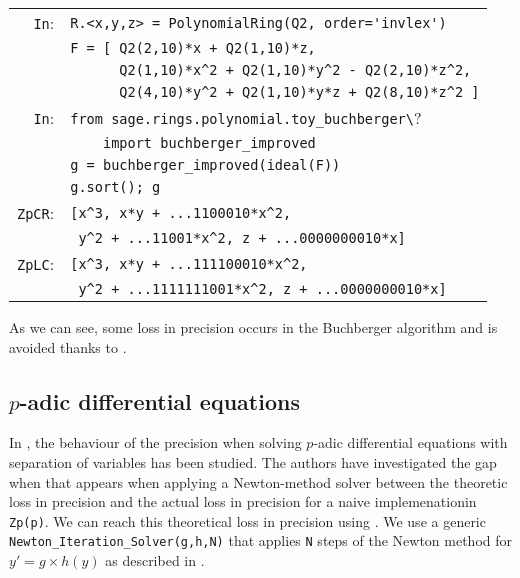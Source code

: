 \documentclass[sigconf]{acmart}
\newcommand{\ZpFP}{\text{\color{output} \rm \tt ZpFP}\xspace}
\newcommand{\ZpL}{\text{\color{output} \rm \tt ZpL}\xspace}
\newcommand{\cIn}{{\color{input} \tt \phantom{Zp}In}:}
\newcommand{\cZpCR}{{\color{output} \tt ZpCR}:}
\newcommand{\cZpLC}{{\color{output} \tt ZpLC}:}
\theoremstyle{definition}
\begin{document}
{\noindent \small
\begin{tabular}{@{}rl}
\cIn
 & \verb?R.<x,y,z> = ?{\color{constructor}\verb?PolynomialRing?}\verb?(?{\color{ring}\verb?Q2?}\verb?, order=?{\color{string}\verb?'invlex'?}\verb?)? \\
 & \verb?F = [ ?{\color{ring}\verb?Q2?}\verb?(2,10)*x + ?{\color{ring}\verb?Q2?}\verb?(1,10)*z, ? \\
 & \verb?      ?{\color{ring}\verb?Q2?}\verb?(1,10)*x^2 + ?{\color{ring}\verb?Q2?}\verb?(1,10)*y^2 - ?{\color{ring}\verb?Q2?}\verb?(2,10)*z^2,? \\
 & \verb?      ?{\color{ring}\verb?Q2?}\verb?(4,10)*y^2 + ?{\color{ring}\verb?Q2?}\verb?(1,10)*y*z + ?{\color{ring}\verb?Q2?}\verb?(8,10)*z^2 ]? \\
\cIn
 & {\color{keyword}\verb?from?}\verb? sage.rings.polynomial.toy_buchberger\?\\
 & \verb?    ?{\color{keyword}\verb?import?}\verb? ?{\color{function}\verb?buchberger_improved?} \\
 & \verb?g = ?{\color{function}\verb?buchberger_improved?}\verb?(ideal(F))? \\
 & \verb?g.?{\color{method}\verb?sort?}\verb?(); g? \\
\cZpCR
 & \verb?[x^3, x*y + ...1100010*x^2,? \\
 & \verb? y^2 + ...11001*x^2, z + ...0000000010*x]? \\
\cZpLC
 & \verb?[x^3, x*y + ...111100010*x^2,? \\
 & \verb? y^2 + ...1111111001*x^2, z + ...0000000010*x]? \\
\end{tabular}}

\smallskip

As we can see, some loss in precision occurs in the
Buchberger algorithm and is avoided thanks to \ZpL.

\subsection{$p$-adic differential equations}

In \cite{LV16}, the behaviour of the precision when solving
$p$-adic differential equations with separation of 
variables has been studied.
The authors have investigated the gap when that appears
when applying a Newton-method solver between
the theoretic loss in precision and the 
actual loss in precision for a naive implemenationin \verb?Zp(p)?.
We can reach this theoretical loss in precision using \ZpL.
We use a generic {\color{function}\verb?Newton_Iteration_Solver?}\verb?(g,h,N)?
that applies \verb?N? steps of the Newton method for 
$y'=g \times h(y)$ as described in \cite{LV16}.
\end{document}
